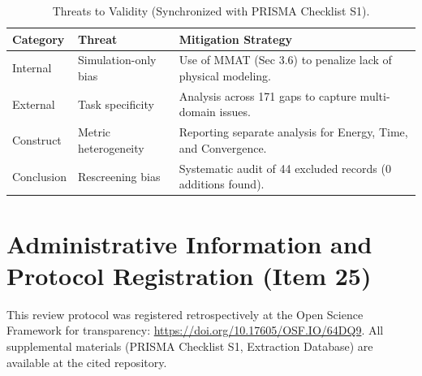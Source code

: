 \documentclass[review,3p,times]{elsarticle}
\begin{document}
\begin{table}[ht]
\caption{Threats to Validity (Synchronized with PRISMA Checklist S1).}
\label{tab:threats_validity}
\begin{tabularx}{\textwidth}{l X X}
\toprule
\textbf{Category} & \textbf{Threat} & \textbf{Mitigation Strategy} \\
\midrule
Internal & Simulation-only bias & Use of MMAT (Sec 3.6) to penalize lack of physical modeling. \\
External & Task specificity & Analysis across 171 gaps to capture multi-domain issues. \\
Construct & Metric heterogeneity & Reporting separate analysis for Energy, Time, and Convergence. \\
Conclusion & Rescreening bias & Systematic audit of 44 excluded records (0 additions found). \\
\bottomrule
\end{tabularx}
\end{table}

\section{Administrative Information and Protocol Registration (Item 25)}
\label{sec:admin}
This review protocol was registered retrospectively at the Open Science Framework for transparency: \url{https://doi.org/10.17605/OSF.IO/64DQ9}. All supplemental materials (PRISMA Checklist S1, Extraction Database) are available at the cited repository.
\end{document}
